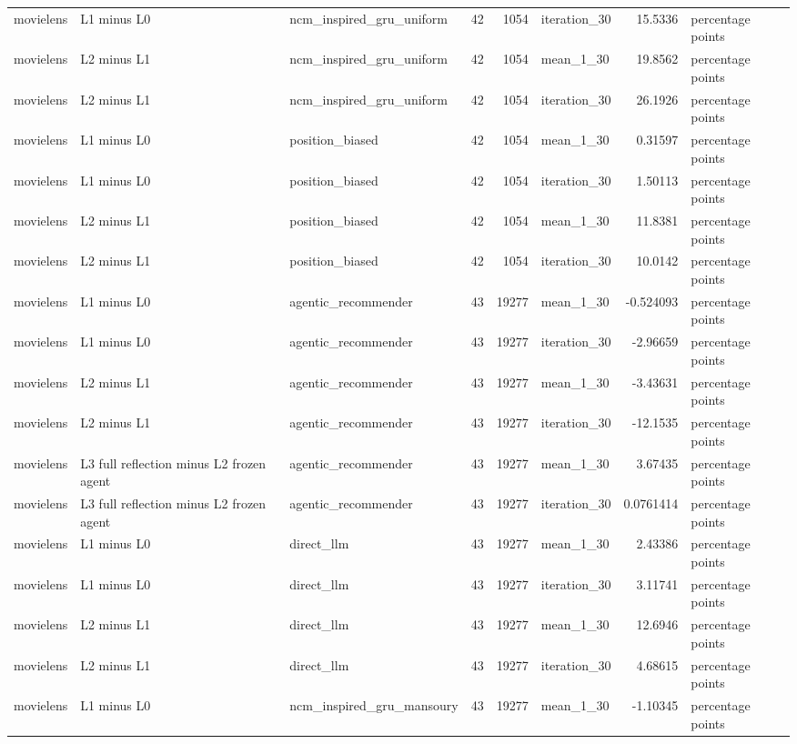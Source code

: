 \begin{table}[htbp!]
\begin{tabular}{lllrrlrl}
movielens & L1 minus L0 & ncm\_inspired\_gru\_uniform & 42 & 1054 & iteration\_30 & 15.5336 & percentage points \\
movielens & L2 minus L1 & ncm\_inspired\_gru\_uniform & 42 & 1054 & mean\_1\_30 & 19.8562 & percentage points \\
movielens & L2 minus L1 & ncm\_inspired\_gru\_uniform & 42 & 1054 & iteration\_30 & 26.1926 & percentage points \\
movielens & L1 minus L0 & position\_biased & 42 & 1054 & mean\_1\_30 & 0.31597 & percentage points \\
movielens & L1 minus L0 & position\_biased & 42 & 1054 & iteration\_30 & 1.50113 & percentage points \\
movielens & L2 minus L1 & position\_biased & 42 & 1054 & mean\_1\_30 & 11.8381 & percentage points \\
movielens & L2 minus L1 & position\_biased & 42 & 1054 & iteration\_30 & 10.0142 & percentage points \\
movielens & L1 minus L0 & agentic\_recommender & 43 & 19277 & mean\_1\_30 & -0.524093 & percentage points \\
movielens & L1 minus L0 & agentic\_recommender & 43 & 19277 & iteration\_30 & -2.96659 & percentage points \\
movielens & L2 minus L1 & agentic\_recommender & 43 & 19277 & mean\_1\_30 & -3.43631 & percentage points \\
movielens & L2 minus L1 & agentic\_recommender & 43 & 19277 & iteration\_30 & -12.1535 & percentage points \\
movielens & L3 full reflection minus L2 frozen agent & agentic\_recommender & 43 & 19277 & mean\_1\_30 & 3.67435 & percentage points \\
movielens & L3 full reflection minus L2 frozen agent & agentic\_recommender & 43 & 19277 & iteration\_30 & 0.0761414 & percentage points \\
movielens & L1 minus L0 & direct\_llm & 43 & 19277 & mean\_1\_30 & 2.43386 & percentage points \\
movielens & L1 minus L0 & direct\_llm & 43 & 19277 & iteration\_30 & 3.11741 & percentage points \\
movielens & L2 minus L1 & direct\_llm & 43 & 19277 & mean\_1\_30 & 12.6946 & percentage points \\
movielens & L2 minus L1 & direct\_llm & 43 & 19277 & iteration\_30 & 4.68615 & percentage points \\
movielens & L1 minus L0 & ncm\_inspired\_gru\_mansoury & 43 & 19277 & mean\_1\_30 & -1.10345 & percentage points \\

\end{tabular}
\end{table}
